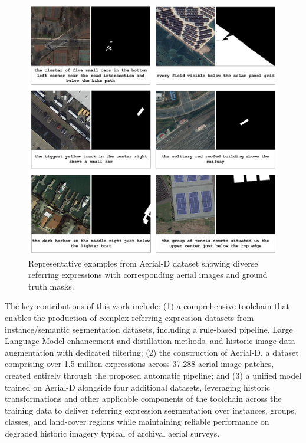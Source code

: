 \begingroup
\setlength{\intextsep}{6pt}
\setlength{\abovecaptionskip}{2pt}
\setlength{\belowcaptionskip}{0pt}
\begin{figure}[H]
\centering
\includegraphics[width=\columnwidth]{./images/6samples.png}
\caption{Representative examples from Aerial-D dataset showing diverse referring expressions with corresponding aerial images and ground truth masks.}
\label{fig:dataset_examples}
\end{figure}
\endgroup


The key contributions of this work include: (1) a comprehensive toolchain that enables the production of complex referring expression datasets from instance/semantic segmentation datasets, including a rule-based pipeline, Large Language Model enhancement and distillation methods, and historic image data augmentation with dedicated filtering; (2) the construction of Aerial-D, a dataset comprising over 1.5 million expressions across 37,288 aerial image patches, created entirely through the proposed automatic pipeline; and (3) a unified model trained on Aerial-D alongside four additional datasets, leveraging historic transformations and other applicable components of the toolchain across the training data to deliver referring expression segmentation over instances, groups, classes, and land-cover regions while maintaining reliable performance on degraded historic imagery typical of archival aerial surveys.
